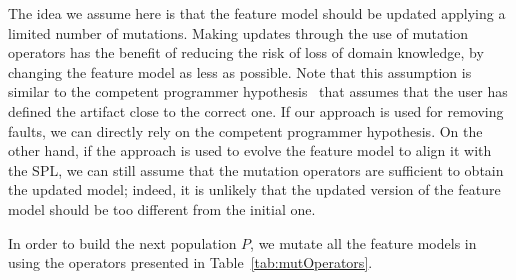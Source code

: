 \begin{tikzborder}{\cite{Gargantini16:validation}}
\begin{tikzborder}{\cite{gargantini_combinatorial_2017}}
\begin{tikzborder}{\cite{gargantini_combinatorial_2017}}
\begin{tikzborder}{\cite{garn2019}}
\begin{tikzborder}{\cite{arcaini2019achieving}}
	The idea we assume here is that the feature model should be updated applying a limited number of mutations. Making updates through the use of mutation operators has the benefit of reducing the risk of loss of domain knowledge, by changing the feature model as less as possible. Note that this assumption is similar to the competent programmer hypothesis~\cite{surveyMutationTesting} that assumes that the user has defined the artifact close to the correct one. If our approach is used for removing faults, we can directly rely on the competent programmer hypothesis. On the other hand, if the approach is used to evolve the feature model to align it with the SPL, we can still assume that the mutation operators are sufficient to obtain the updated model; indeed, it is unlikely that the updated version of the feature model should be too different from the initial one.
	
	In order to build the next population $P$, we mutate all the feature models in \PAR using the operators presented in Table~\ref{tab:mutOperators}.\be
	

\end{tikzborder}
\end{tikzborder}
\end{tikzborder}
\end{tikzborder}
\end{tikzborder}
